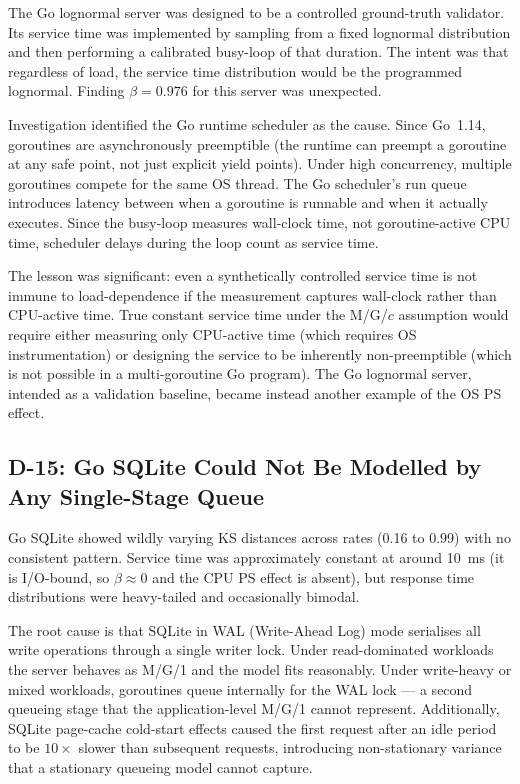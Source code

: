 The Go lognormal server was designed to be a controlled ground-truth validator. Its service time was implemented by sampling from a fixed lognormal distribution and then performing a calibrated busy-loop of that duration. The intent was that regardless of load, the service time distribution would be the programmed lognormal. Finding $\beta = 0.976$ for this server was unexpected.

Investigation identified the Go runtime scheduler as the cause. Since Go~1.14, goroutines are asynchronously preemptible (the runtime can preempt a goroutine at any safe point, not just explicit yield points). Under high concurrency, multiple goroutines compete for the same OS thread. The Go scheduler's run queue introduces latency between when a goroutine is runnable and when it actually executes. Since the busy-loop measures wall-clock time, not goroutine-active CPU time, scheduler delays during the loop count as service time.

The lesson was significant: even a synthetically controlled service time is not immune to load-dependence if the measurement captures wall-clock rather than CPU-active time. True constant service time under the M/G/$c$ assumption would require either measuring only CPU-active time (which requires OS instrumentation) or designing the service to be inherently non-preemptible (which is not possible in a multi-goroutine Go program). The Go lognormal server, intended as a validation baseline, became instead another example of the OS PS effect.

\subsection{D-15: Go SQLite Could Not Be Modelled by Any Single-Stage Queue}

Go SQLite showed wildly varying KS distances across rates (0.16 to 0.99) with no consistent pattern. Service time was approximately constant at around 10~ms (it is I/O-bound, so $\beta \approx 0$ and the CPU PS effect is absent), but response time distributions were heavy-tailed and occasionally bimodal.

The root cause is that SQLite in WAL (Write-Ahead Log) mode serialises all write operations through a single writer lock. Under read-dominated workloads the server behaves as M/G/1 and the model fits reasonably. Under write-heavy or mixed workloads, goroutines queue internally for the WAL lock — a second queueing stage that the application-level M/G/1 cannot represent. Additionally, SQLite page-cache cold-start effects caused the first request after an idle period to be $10\times$ slower than subsequent requests, introducing non-stationary variance that a stationary queueing model cannot capture.

